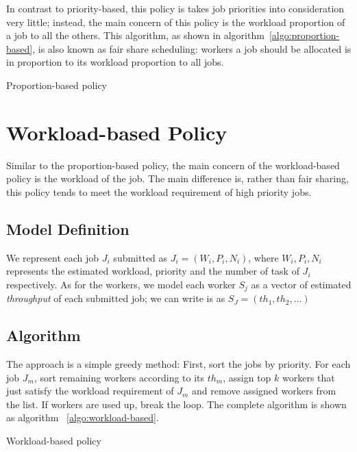 In contrast to priority-based, this policy is takes job priorities into
consideration very little; instead, the main concern of this policy is
the workload proportion of a job to all the others.
This algorithm, as shown in algorithm~\ref{algo:proportion-based}, is
also known as fair share scheduling: workers a job should be allocated
is in proportion to its workload proportion to all jobs. 

\begin{algorithm}[H]
  \DontPrintSemicolon %
  
  \caption{Proportion-based policy}
  \label{algo:proportion-based}
\end{algorithm}

\section{Workload-based Policy}

Similar to the proportion-based policy, the main concern of the
workload-based policy is the workload of the job.
The main difference is, rather than fair sharing, this policy tends to
meet the workload requirement of high priority jobs.

\subsection{Model Definition}

We represent each job $J_i$ submitted as $J_i = (W_i, P_i, N_i)$, where
$W_i, P_i, N_i$ represents the estimated workload, priority and the
number of task of $J_i$ respectively.
As for the workers, we model each worker $S_j$ as a vector of estimated
\emph{throughput} of each submitted job; we can write is as $S_J =
(th_1, th_2, \ldots)$


\subsection{Algorithm}

The approach is a simple greedy method:
First, sort the jobs by priority.
For each job $J_m$, sort remaining workers according to its $th_m$,
assign top $k$ workers that just satisfy the workload requirement of
$J_m$ and remove assigned workers from the list.
If workers are used up, break the loop.
The complete algorithm is shown as algorithm ~\ref{algo:workload-based}.

\begin{algorithm}[H]
  \DontPrintSemicolon %
  
  \caption{Workload-based policy}
  \label{algo:workload-based}
\end{algorithm}

